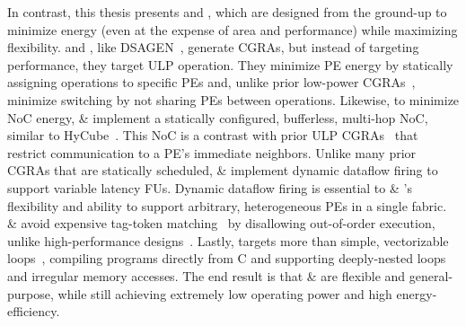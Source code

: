 In contrast, this thesis presents \snafu and \riptide, which are designed from the ground-up to minimize energy (even at the expense of area and performance) while maximizing flexibility.
% 
\snafu and \riptide, like DSAGEN~\cite{weng2020dsagen}, generate CGRAs, but instead of targeting performance, they target ULP operation.
%
They minimize PE energy by statically assigning operations
to specific PEs and, unlike prior low-power
CGRAs~\cite{tan2018stitch,karunaratne2017hycube,ipa,cma,srp},
minimize switching by not sharing PEs between operations.
%
Likewise, to minimize NoC energy, \snafu \& \riptide implement a statically configured, bufferless, multi-hop NoC,
similar to HyCube~\cite{karunaratne2017hycube}.
This NoC is a contrast with prior ULP CGRAs~\cite{cma,srp,ipa}
that restrict communication to a PE's immediate neighbors.
%
Unlike many prior CGRAs that are statically scheduled,
\snafu \& \riptide implement dynamic dataflow firing
to support variable latency FUs.
%
Dynamic dataflow firing is essential to \snafu \& \riptide's flexibility
and ability to support arbitrary, heterogeneous PEs in a single fabric.
%
\snafu \& \riptide avoid expensive tag-token matching~\cite{plasticine,dyser}
by disallowing out-of-order execution, unlike high-performance designs~\cite{ttda,parashar2013triggered,voitsechov2014single,swanson2003wavescalar}.
% 
Lastly, \riptide targets more than simple, vectorizable loops~\cite{karunaratne2017hycube,ipa,cma,srp}, compiling programs directly from C and supporting deeply-nested loops and irregular memory accesses.
%
The end result is that \snafu \& \riptide are flexible and general-purpose,
while still achieving extremely low operating power and high energy-efficiency.

